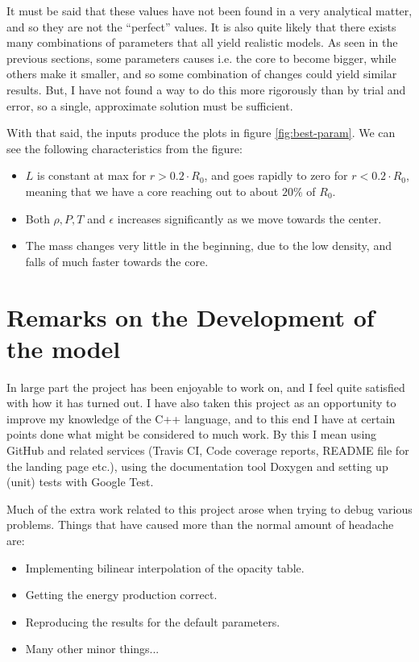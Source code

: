 \documentclass[11pt,twocolumn]{article}
\begin{document}
It must be said that these values have not been found in a very
analytical matter, and so they are not the ``perfect'' values. It is also
quite likely that there exists many combinations of parameters that
all yield realistic models. As seen in the previous sections, some
parameters causes i.e. the core to become bigger, while others make it
smaller, and so some combination of changes could yield similar
results. But, I have not found a way to do this more rigorously than
by trial and error, so a single, approximate solution must be
sufficient.

With that said, the inputs produce the plots in figure
\ref{fig:best-param}. We can see the following characteristics from
the figure:

\begin{itemize}
  \item $L$ is constant at max for $r>0.2\cdot R_0$, and goes rapidly
    to zero for $r<0.2 \cdot R_0$, meaning that we have a core
    reaching out to about $20\%$ of $R_0$.
  \item Both $\rho,P,T$ and $\epsilon$ increases significantly as we move
    towards the center.
  \item The mass changes very little in the beginning, due to the low
    density, and falls of much faster towards the core. 
\end{itemize}





\section{Remarks on the Development of the model}
In large part the project has been enjoyable to work on, and I feel
quite satisfied with how it has turned out. I have also taken this
project as an opportunity to improve my knowledge of the C++ language,
and to this end I have at certain points done what might be considered
to much work. By this I mean using GitHub and related services
(Travis CI, Code coverage reports, README file for the landing page
etc.), using the documentation tool Doxygen and setting up
(unit) tests with Google Test. 

Much of the extra work related to this project arose when trying to
debug various problems. Things that have caused more than the normal
amount of headache are:

\begin{itemize}
  \item Implementing bilinear interpolation of the opacity table.
  \item Getting the energy production correct.
  \item Reproducing the results for the default parameters.
  \item Many other minor things...
\end{itemize}
\end{document}
